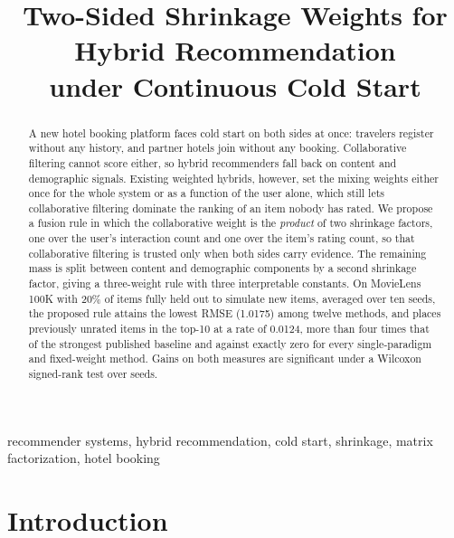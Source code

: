 \documentclass[conference]{IEEEtran}
\begin{document}
\title{Two-Sided Shrinkage Weights for Hybrid Recommendation\\
under Continuous Cold Start}

\author{
}

\maketitle

\begin{abstract}
A new hotel booking platform faces cold start on both sides at once:
travelers register without any history, and partner hotels join
without any booking. Collaborative filtering cannot score either, so
hybrid recommenders fall back on content and demographic signals.
Existing weighted hybrids, however, set the mixing weights either
once for the whole system or as a function of the user alone, which
still lets collaborative filtering dominate the ranking of an item
nobody has rated. We propose a fusion rule in which the collaborative
weight is the \emph{product} of two shrinkage factors, one over the
user's interaction count and one over the item's rating count, so
that collaborative filtering is trusted only when both sides carry
evidence. The remaining mass is split between content and
demographic components by a second shrinkage factor, giving a
three-weight rule with three interpretable constants. On MovieLens
100K with 20\% of items fully held out to simulate new items,
averaged over ten seeds, the proposed rule attains the lowest RMSE
(1.0175) among twelve methods, and places previously unrated items
in the top-10 at a rate of 0.0124, more than four times that of the
strongest published baseline and against exactly zero for every
single-paradigm and fixed-weight method. Gains on both measures are
significant under a Wilcoxon signed-rank test over seeds.
\end{abstract}

\begin{IEEEkeywords}
recommender systems, hybrid recommendation, cold start, shrinkage,
matrix factorization, hotel booking
\end{IEEEkeywords}

\section{Introduction}
\end{document}
